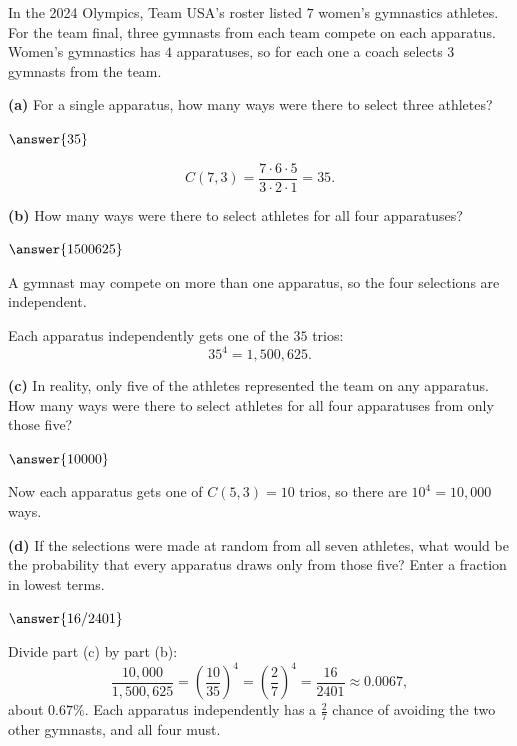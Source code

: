 \documentclass[12pt]{ximera}
\begin{document}
\begin{problem}
In the 2024 Olympics, Team USA's roster listed $7$ women's gymnastics athletes. For the
team final, three gymnasts from each team compete on each apparatus. Women's gymnastics
has $4$ apparatuses, so for each one a coach selects $3$ gymnasts from the team.

\begin{prompt}
\textbf{(a)} For a single apparatus, how many ways were there to select three
athletes?

$\answer{35}$

\begin{feedback}
\[ C(7,3)=\frac{7\cdot 6\cdot 5}{3\cdot 2\cdot 1}=35. \]
\end{feedback}
\end{prompt}

\begin{prompt}
\textbf{(b)} How many ways were there to select athletes for all four apparatuses?

$\answer{1500625}$

\begin{hint}
A gymnast may compete on more than one apparatus, so the four selections are
independent.
\end{hint}

\begin{feedback}
Each apparatus independently gets one of the $35$ trios:
\[ 35^4 = 1{,}500{,}625. \]
\end{feedback}
\end{prompt}

\begin{prompt}
\textbf{(c)} In reality, only five of the athletes represented the team on any
apparatus. How many ways were there to select athletes for all four apparatuses from
only those five?

$\answer{10000}$

\begin{feedback}
Now each apparatus gets one of $C(5,3)=10$ trios, so there are $10^4=10{,}000$ ways.
\end{feedback}
\end{prompt}

\begin{prompt}
\textbf{(d)} If the selections were made at random from all seven athletes, what would
be the probability that every apparatus draws only from those five? Enter a fraction in
lowest terms.

$\answer{16/2401}$

\begin{feedback}
Divide part (c) by part (b):
\[
\frac{10{,}000}{1{,}500{,}625}=\left(\frac{10}{35}\right)^4=\left(\frac27\right)^4=\frac{16}{2401}\approx 0.0067,
\]
about $0.67\%$. Each apparatus independently has a $\frac27$ chance of avoiding the two
other gymnasts, and all four must.
\end{feedback}
\end{prompt}
\end{problem}
\end{document}
